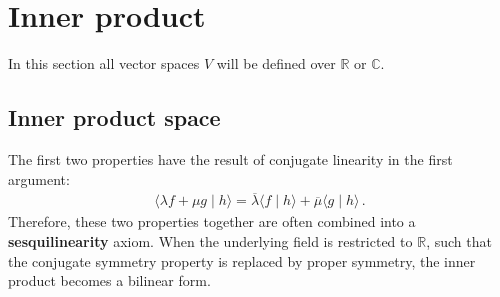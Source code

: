 \section{Inner product}\label{section:innerproduct}

    In this section all vector spaces $V$ will be defined over $\mathbb{R}$ or $\mathbb{C}$.

\subsection{Inner product space}

    \begin{result}
        The first two properties have the result of conjugate linearity in the first argument:
        \begin{gather}
            \langle \lambda f + \mu g\mid h \rangle = \overline{\lambda}\langle f\mid h \rangle + \overline{\mu}\langle g\mid h \rangle\,.
        \end{gather}
        Therefore, these two properties together are often combined into a \textbf{sesquilinearity} axiom. When the underlying field is restricted to $\mathbb{R}$, such that the conjugate symmetry property is replaced by proper symmetry, the inner product becomes a bilinear form.
    \end{result}


